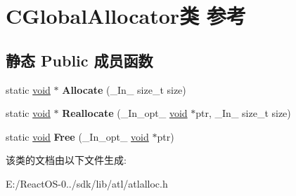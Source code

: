 \hypertarget{class_c_global_allocator}{}\section{C\+Global\+Allocator类 参考}
\label{class_c_global_allocator}
\subsection*{静态 Public 成员函数}
\begin{DoxyCompactItemize}
\item 
\mbox{\label{class_c_global_allocator_a152af73756b33555ebe5cb81ef81fe9f}} 
static \hyperlink{interfacevoid}{void} $\ast$ {\bfseries Allocate} (\+\_\+\+In\+\_\+ size\+\_\+t size)
\item 
\mbox{\label{class_c_global_allocator_ab37ed27c4d04e94bc6c494c63f81b001}} 
static \hyperlink{interfacevoid}{void} $\ast$ {\bfseries Reallocate} (\+\_\+\+In\+\_\+opt\+\_\+ \hyperlink{interfacevoid}{void} $\ast$ptr, \+\_\+\+In\+\_\+ size\+\_\+t size)
\item 
\mbox{\label{class_c_global_allocator_acfa5293e5697d2cd184a07c61cf644a2}} 
static \hyperlink{interfacevoid}{void} {\bfseries Free} (\+\_\+\+In\+\_\+opt\+\_\+ \hyperlink{interfacevoid}{void} $\ast$ptr)
\end{DoxyCompactItemize}


该类的文档由以下文件生成\+:\begin{DoxyCompactItemize}
\item 
E\+:/\+React\+O\+S-\/0../sdk/lib/atl/atlalloc.\+h\end{DoxyCompactItemize}
